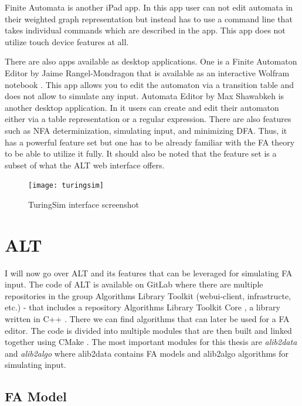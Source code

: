 Finite Automata \cite{finite-automata-app} is another iPad app. In this app user can not edit automata in their weighted graph representation but instead has to use a command line that takes individual commands which are described in the app. This app does not utilize touch device features at all.

There are also apps available as desktop applications. One is a Finite Automaton Editor by Jaime Rangel-Mondragon that is available as an interactive Wolfram notebook \cite{wolfram-editor}. This app allows you to edit the automaton via a transition table and does not allow to simulate any input. Automata Editor by Max Shawabkeh \cite{automata-editor-max} is another desktop application. In it users can create and edit their automaton either via a table representation or a regular expression. There are also features such as NFA determinization, simulating input, and minimizing DFA. Thus, it has a powerful feature set but one has to be already familiar with the FA theory to be able to utilize it fully. It should also be noted that the feature set is a subset of what the ALT web interface offers.

\begin{figure}
    \texttt{[image: turingsim]}
    \caption{TuringSim interface screenshot}\label{turingsim-screen}
\end{figure}

\section{ALT}

I will now go over ALT and its features that can be leveraged for simulating FA input. The code of ALT is available on GitLab \cite{gitlab} where there are multiple repositories in the group Algorithms Library Toolkit (webui-client, infrastructe, etc.) - that includes a repository Algorithms Library Toolkit Core \cite{alt-code}, a library written in C++ \cite{c++}. There we can find algorithms that can later be used for a FA editor. The code is divided into multiple modules that are then built and linked together using CMake \cite{cmake}. The most important modules for this thesis are \textit{alib2data} and \textit{alib2algo} where alib2data contains FA models and alib2algo algorithms for simulating input.

\subsection{FA Model}

